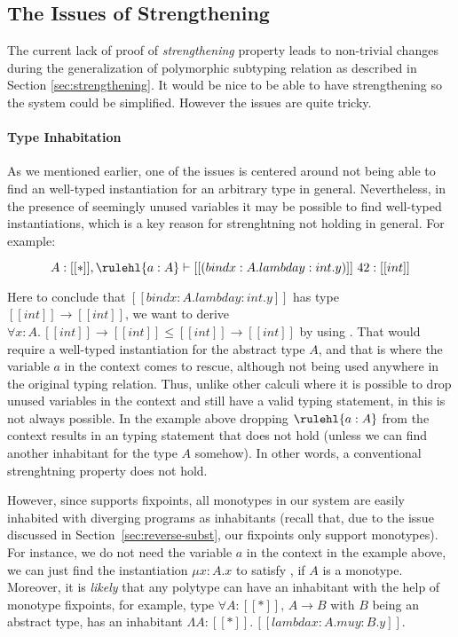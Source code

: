 \subsection{The Issues of Strengthening}
\label{sec:habitability}

The current lack of proof of \emph{strengthening} property leads to non-trivial
changes during the generalization of polymorphic subtyping relation as
described in Section \ref{sec:strengthening}. It would be nice to be able to
have strengthening so the system could be simplified. However the issues are
quite tricky.

\paragraph{Type Inhabitation}
As we mentioned earlier, one of the issues is centered around not being able to find an
well-typed instantiation for an arbitrary type in general. Nevertheless, in the presence of
seemingly unused variables it may be possible to find well-typed instantiations,
which is a key reason for strenghtning not holding in general. For example:

\begin{equation*}
    A : [[*]], \rulehl{a : A} \vdash [[(bind x : A. lambda y : int. y)]]~42 : [[int]]
\end{equation*}

Here to conclude that $[[bind x : A. lambda y : int. y]]$ has type $[[int]] \rightarrow [[int]]$,
we want to derive $\forall x : A.\, [[int]] \rightarrow [[int]] \le [[int]] \rightarrow [[int]]$ by
using . That would require a well-typed instantiation
for the abstract type $A$, and that is where the variable $a$ in the context
comes to rescue, although not being used anywhere in the original typing relation.
Thus, unlike other calculi where it is possible to drop unused variables in the context
and still have a valid typing statement, in \name this is not always possible. In the example
above dropping $\rulehl{a : A}$ from the context results in an typing statement that does not hold
(unless we can find another inhabitant for the type $A$ somehow).
In other words, a conventional strenghtning property does not hold.

However, since \name supports fixpoints, all monotypes in our system
are easily inhabited with diverging programs as inhabitants (recall that, due
to the issue discussed in Section~\ref{sec:reverse-subst}, our fixpoints only support monotypes).
For instance, we do not need the variable $a$ in the context in the example above,
we can just find the instantiation $\mu x : A. x$ to satisfy , if $A$ is a
monotype.
Moreover, it is \emph{likely} that any polytype can have an inhabitant with the help
of monotype fixpoints, for example, type $\forall A : [[*]],\, A \rightarrow B$ with $B$
being an abstract type, has an inhabitant $\Lambda A : [[*]].\,[[lambda x : A. mu y : B. y]]$.

